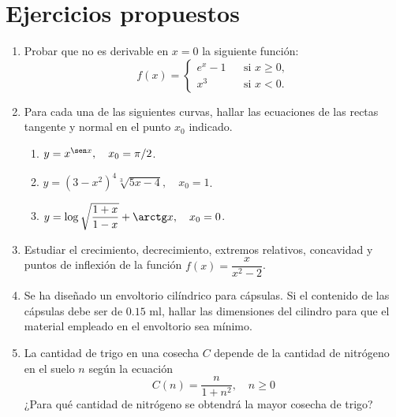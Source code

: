 \section{Ejercicios propuestos}
\begin{enumerate}[leftmargin=*]
\item  Probar que no es derivable en $x=0$ la siguiente función:
\[ f(x)=\left\{
\begin{array}{ccl}
e^x-1 &  & \mbox{si } x\geq 0,  \\
x^3 &  & \mbox{si } x<0.
\end{array}\right.
\]

\item  Para cada una de las siguientes curvas, hallar las ecuaciones de las rectas tangente y normal en el punto $x_{0}$ indicado.
\begin{enumerate}
\item  $y=x^{\sen x},\quad x_{0}=\pi/2$.
\item  $y=(3-x^2)^4\sqrt[3]{5x-4},\quad x_{0}=1$.
\item  $y=\log \sqrt{\dfrac{1+x}{1-x}}+\arctg x, \quad x_{0}=0$.
\end{enumerate}

\item Estudiar el crecimiento, decrecimiento, extremos relativos, concavidad y puntos de inflexión de la función $f(x)=\dfrac{x}{x^2-2}$. 

\item Se ha diseñado un envoltorio cilíndrico para cápsulas.
Si el contenido de las cápsulas debe ser de $0.15$ ml, hallar las dimensiones del cilindro para que el material empleado en el envoltorio
sea mínimo.

\item La cantidad de trigo en una cosecha $C$ depende de la cantidad de nitrógeno en el suelo $n$ según la ecuación 
\[
C(n) = \frac{n}{1+n^2}, \quad n\geq0
\]
¿Para qué cantidad de nitrógeno se obtendrá la mayor cosecha de trigo? 
\end{enumerate}
